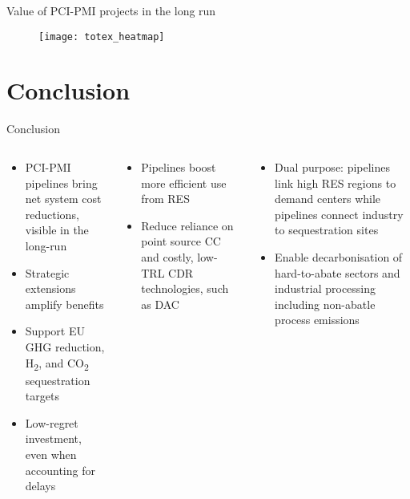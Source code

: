 \documentclass[10pt,aspectratio=169,dvipsnames]{beamer}
\begin{document}
\begin{frame}{Value of PCI-PMI projects in the long run}
  \begin{figure}[htbp]
    \centering
    \texttt{[image: totex\_heatmap]}
  \end{figure}
\end{frame}

\section{Conclusion}

\begin{frame}{Conclusion}
\vspace{-0.4cm}
\begin{columns}[t,onlytextwidth]
  \footnotesize
    \begin{tcolorbox}[colback=blue!5, colframe=blue!40!black, fonttitle=\bfseries, title=Economic viability \& policy targets]
    \centering
    \scriptsize
    \begin{itemize}
      \item PCI-PMI pipelines bring net system cost reductions, visible in the long-run
      \item Strategic extensions amplify benefits  
      \item Support EU GHG reduction, H\textsubscript{2}, and CO\textsubscript{2} sequestration targets  
      \item Low-regret investment, even when accounting for delays
    \end{itemize}
    \end{tcolorbox}
    
    \vspace{0.02cm}
    \begin{tcolorbox}[colback=orange!5, colframe=orange!60!black, fonttitle=\bfseries, title=Tech \& risk diversification]
    \centering
    \scriptsize
    \begin{itemize}
      \item Pipelines boost more efficient use from RES  
      \item Reduce reliance on point source CC and costly, low-TRL CDR technologies, such as DAC  
    \end{itemize}
    \end{tcolorbox}

    \begin{tcolorbox}[colback=green!5, colframe=green!40!black, fonttitle=\bfseries, title=CCUS \& hydrogen utilisation]
    \centering
    \scriptsize
    \begin{itemize}
      \item Dual purpose:  pipelines link high RES regions to demand centers while  pipelines connect industry to sequestration sites  
      \item Enable decarbonisation of hard-to-abate sectors and industrial processing including non-abatle process emissions
    \end{itemize}
    \end{tcolorbox}
    

\end{columns}
\end{frame}
\end{document}
